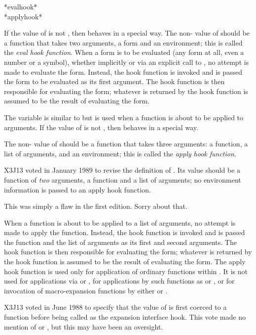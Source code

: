 \begin{defun}[Variable]
*evalhook* \\
*applyhook*

If the value of  is not {\false}, then  behaves
in a special way.  The non-{\false} value of  should be a function
that takes two arguments, a form and an environment;
this is called the \emph{eval hook function}.
When a form is to be evaluated (any form at all, even a number or a symbol),
whether implicitly or via an explicit call to , no attempt
is made to evaluate the form.
Instead, the hook function is invoked and is passed the form to be evaluated
as its first argument.  The hook function is then responsible for
evaluating the form; whatever is returned by the hook function is assumed
to be the result of evaluating the form.

The variable  is similar to  but is used
when a function is about to be applied to arguments.
If the value of  is not {\false}, then  behaves
in a special way.
\begin{obsolete}
The non-{\false} value of  should be a function
that takes three arguments: a function, a list of arguments,
and an environment;
this is called the \emph{apply hook function}.
\end{obsolete}

\begin{new}
X3J13 voted in January 1989
to revise the definition of .
Its value should be a function of \emph{two} arguments,
a function and a list of arguments; no environment information is passed
to an apply hook function.

This was simply a flaw in the first edition.  Sorry about that.
\end{new}

When a function is about to be applied to a list of arguments,
no attempt is made to apply the function.
Instead, the hook function is invoked and is passed the function and the list
of arguments
as its first and second arguments.  The hook function is then responsible for
evaluating the form; whatever is returned by the hook function is assumed
to be the result of evaluating the form.
The apply hook function is used only for application of ordinary functions
within .  It is not used for applications via  or
, for applications by such functions as  or
, or for invocation of macro-expansion functions
by either  or .
\begin{newer}
X3J13 voted in June 1988  to specify
that the value of  is first coerced to a
function before being called as the expansion interface hook.
This vote made no mention of  or ,
but this may have been an oversight.


\end{newer}
\end{defun}
